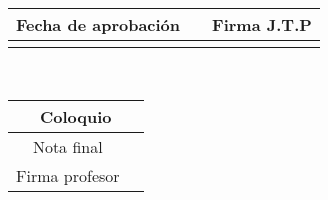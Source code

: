 \begin{titlepage}
\begin{center}
\vspace{10mm}

\begin{tabular}{|c|c|c|c|c|}
\hline
\multicolumn{3}{|c|}{Fecha de aprobación} & \hspace{10mm} & Firma J.T.P\\
\hline
\hspace{10mm} & \hspace{10mm} & \hspace{10mm} &&\\
\hline
\end{tabular}
\-\\
\vspace{10mm}
\begin{tabular}{|c|c|}
\hline
\multicolumn{2}{|c|}{Coloquio}\\
\hline
Nota final&\hspace{2cm} \\
\hline
Firma profesor&\hspace{2cm} \\
\hline
\end{tabular}
\end{center}
\end{titlepage}

\ifPagebreak
	\thispagestyle{empty}
	\ifIndex
		\tableofcontents
	\fi

	\pagebreak
\fi
